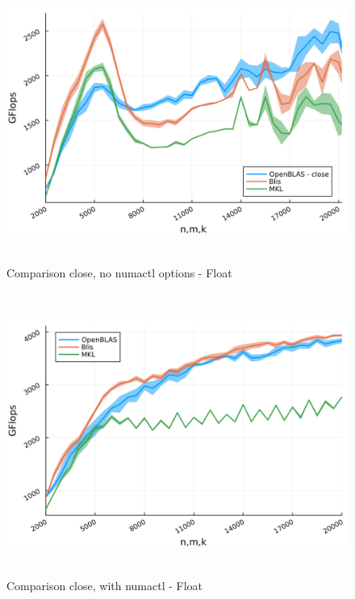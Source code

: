 \documentclass[
  letterpaper,
  DIV=11,
  numbers=noendperiod]{scrartcl}
\begin{document}
\begin{figure}

{\centering \includegraphics[width=\textwidth,height=3.64583in]{img/float_close_comparison.png}

}

\caption{Comparison close, no numactl options - Float}

\end{figure}

\begin{figure}

{\centering \includegraphics[width=\textwidth,height=3.64583in]{img/float_numactl_close_comparison.png}

}

\caption{Comparison close, with numactl - Float}

\end{figure}
\end{document}
